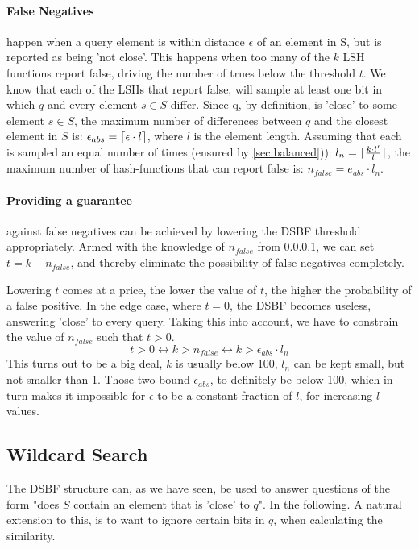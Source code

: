 \documentclass[a4paper,11pt]{article}
\DeclarePairedDelimiter{\ceil}{\lceil}{\rceil}
\begin{document}
\paragraph{False Negatives} \label{p:fn}happen when a query element is within distance $\epsilon$ of an element in S, but is reported as being 'not close'. This happens when too many of the $k$ LSH functions report false, driving the number of trues below the threshold $t$. We know that each of the LSHs that report false, will sample at least one bit in which $q$ and every element $s \in S$ differ. Since q, by definition, is 'close' to some element $s \in S$, the maximum number of differences between $q$ and the closest element in $S$ is: $\epsilon_{abs} = \ceil{\epsilon \cdot l}$, where $l$ is the element length. Assuming that each is sampled an equal number of times (ensured by \ref{sec:balanced})): $l_n = \ceil{\frac{k \cdot l{'}}{l}}$, the maximum number of hash-functions that can report false is: $n_{false} = e_{abs} \cdot l_n$.

\paragraph{Providing a guarantee} against false negatives can be achieved by lowering the DSBF threshold appropriately. Armed with the knowledge of $n_{false}$ from \ref{p:fn}, we can set $t = k - n_{false}$, and thereby eliminate the possibility of false negatives completely.

Lowering $t$ comes at a price, the lower the value of $t$, the higher the probability of a false positive. In the edge case, where $t=0$, the DSBF becomes useless, answering 'close' to every query. Taking this into account, we have to constrain the value of $n_{false}$ such that $t>0$.
\[t > 0 \leftrightarrow k > n_{false} \leftrightarrow k > \epsilon_{abs} \cdot l_n\]
This turns out to be a big deal, $k$ is usually below 100, $l_n$ can be kept small, but not smaller than 1. Those two bound $\epsilon_{abs}$, to definitely be below 100, which in turn makes it impossible for $\epsilon$ to be a constant fraction of $l$, for increasing $l$ values.

\subsection{Wildcard Search}
The DSBF structure can, as we have seen, be used to answer questions of the form "does $S$ contain an element that is 'close' to $q$". In the following. A natural extension to this, is to want to ignore certain bits in $q$, when calculating the similarity.
\end{document}
